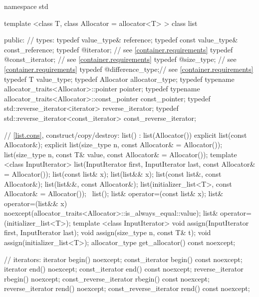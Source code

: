 \begin{codeblock}
namespace std {
  template <class T, class Allocator = allocator<T> >
  class list {
  public:
    // types:
    typedef value_type&                                             reference;
    typedef const value_type&                                       const_reference;
    typedef @\impdef@                iterator;       // see \ref{container.requirements}
    typedef @\impdef@                const_iterator; // see \ref{container.requirements}
    typedef @\impdef@                size_type;      // see \ref{container.requirements}
    typedef @\impdef@                difference_type;// see \ref{container.requirements}
    typedef T                                     value_type;
    typedef Allocator                             allocator_type;
    typedef typename allocator_traits<Allocator>::pointer           pointer;
    typedef typename allocator_traits<Allocator>::const_pointer     const_pointer;
    typedef std::reverse_iterator<iterator>       reverse_iterator;
    typedef std::reverse_iterator<const_iterator> const_reverse_iterator;

    // \ref{list.cons}, construct/copy/destroy:
    list() : list(Allocator()) { }
    explicit list(const Allocator&);
    explicit list(size_type n, const Allocator& = Allocator());
    list(size_type n, const T& value, const Allocator& = Allocator());
    template <class InputIterator>
      list(InputIterator first, InputIterator last, const Allocator& = Allocator());
    list(const list& x);
    list(list&& x);
    list(const list&, const Allocator&);
    list(list&&, const Allocator&);
    list(initializer_list<T>, const Allocator& = Allocator());
   ~list();
    list& operator=(const list& x);
    list& operator=(list&& x)
      noexcept(allocator_traits<Allocator>::is_always_equal::value);
    list& operator=(initializer_list<T>);
    template <class InputIterator>
      void assign(InputIterator first, InputIterator last);
    void assign(size_type n, const T& t);
    void assign(initializer_list<T>);
    allocator_type get_allocator() const noexcept;

    // iterators:
    iterator               begin() noexcept;
    const_iterator         begin() const noexcept;
    iterator               end() noexcept;
    const_iterator         end() const noexcept;
    reverse_iterator       rbegin() noexcept;
    const_reverse_iterator rbegin() const noexcept;
    reverse_iterator       rend() noexcept;
    const_reverse_iterator rend() const noexcept;

}}
\end{codeblock}
